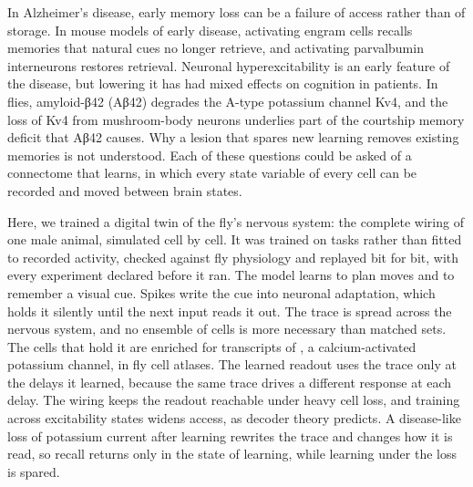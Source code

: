 In Alzheimer's disease, early memory loss can be a failure of access rather than of storage. In mouse models of early disease,
activating engram cells recalls memories that natural cues no longer retrieve, and activating parvalbumin
interneurons restores retrieval. Neuronal hyperexcitability is an early feature of the
disease, but lowering it has had mixed effects on cognition in
patients. In flies, amyloid-β42 (Aβ42) degrades the A-type potassium channel
Kv4, and the loss of Kv4 from mushroom-body neurons underlies part of the courtship memory deficit that Aβ42
causes. Why a lesion that spares new learning removes existing memories is not understood. Each of these
questions could be asked of a connectome that learns, in which every state variable of every cell can be recorded and moved
between brain states.

Here, we trained a digital twin of the fly's nervous system: the complete wiring of one male animal, simulated cell by cell.
It was trained on tasks rather than fitted to recorded activity, checked against fly physiology and replayed bit for bit, with
every experiment declared before it ran. The model learns to plan moves and to remember a visual cue. Spikes write the cue into
neuronal adaptation, which holds it silently until the next input reads it out. The trace is spread across the nervous system,
and no ensemble of cells is more necessary than matched sets. The cells that hold it are enriched for transcripts of
, a calcium-activated potassium channel, in fly cell atlases. The learned readout uses the trace only at the delays it
learned, because the same trace drives a different response at each delay. The wiring keeps the readout reachable under heavy
cell loss, and training across excitability states widens access, as decoder theory predicts. A disease-like loss of potassium current
after learning rewrites the trace and changes how it is read, so recall returns only in the state of learning, while learning
under the loss is spared.
